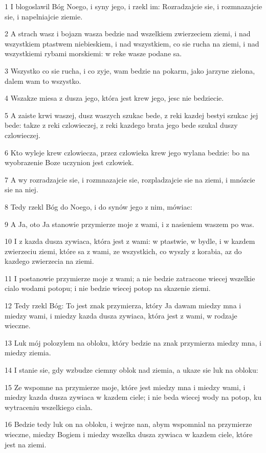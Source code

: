 \par 1 I blogoslawil Bóg Noego, i syny jego, i rzekl im: Rozradzajcie sie, i rozmnazajcie sie, i napelniajcie ziemie.
\par 2 A strach wasz i bojazn wasza bedzie nad wszelkiem zwierzeciem ziemi, i nad wszystkiem ptastwem niebieskiem, i nad wszystkiem, co sie rucha na ziemi, i nad wszystkiemi rybami morskiemi: w reke wasze podane sa.
\par 3 Wszystko co sie rucha, i co zyje, wam bedzie na pokarm, jako jarzyne zielona, dalem wam to wszystko.
\par 4 Wszakze miesa z dusza jego, która jest krew jego, jesc nie bedziecie.
\par 5 A zaiste krwi waszej, dusz waszych szukac bede, z reki kazdej bestyi szukac jej bede: takze z reki czlowieczej, z reki kazdego brata jego bede szukal duszy czlowieczej.
\par 6 Kto wyleje krew czlowiecza, przez czlowieka krew jego wylana bedzie: bo na wyobrazenie Boze uczynion jest czlowiek.
\par 7 A wy rozradzajcie sie, i rozmnazajcie sie, rozpladzajcie sie na ziemi, i mnózcie sie na niej.
\par 8 Tedy rzekl Bóg do Noego, i do synów jego z nim, mówiac:
\par 9 A Ja, oto Ja stanowie przymierze moje z wami, i z nasieniem waszem po was.
\par 10 I z kazda dusza zywiaca, która jest z wami: w ptastwie, w bydle, i w kazdem zwierzeciu ziemi, które sa z wami, ze wszystkich, co wyszly z korabia, az do kazdego zwierzecia na ziemi.
\par 11 I postanowie przymierze moje z wami; a nie bedzie zatracone wiecej wszelkie cialo wodami potopu; i nie bedzie wiecej potop na skazenie ziemi.
\par 12 Tedy rzekl Bóg: To jest znak przymierza, który Ja dawam miedzy mna i miedzy wami, i miedzy kazda dusza zywiaca, która jest z wami, w rodzaje wieczne.
\par 13 Luk mój polozylem na obloku, który bedzie na znak przymierza miedzy mna, i miedzy ziemia.
\par 14 I stanie sie, gdy wzbudze ciemny oblok nad ziemia, a ukaze sie luk na obloku:
\par 15 Ze wspomne na przymierze moje, które jest miedzy mna i miedzy wami, i miedzy kazda dusza zywiaca w kazdem ciele; i nie beda wiecej wody na potop, ku wytraceniu wszelkiego ciala.
\par 16 Bedzie tedy luk on na obloku, i wejrze nan, abym wspomnial na przymierze wieczne, miedzy Bogiem i miedzy wszelka dusza zywiaca w kazdem ciele, które jest na ziemi.
